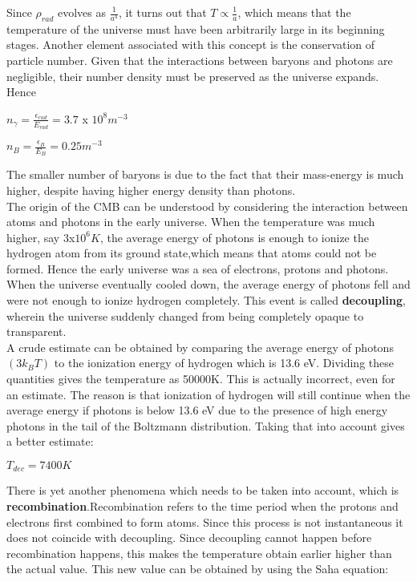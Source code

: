 \documentclass{article}
\begin{document}
Since $\rho_{rad}$ evolves as $\frac{1}{a^4}$, it turns out that $T \propto \frac{1}{a}$, which means that the temperature of the universe must have been arbitrarily large in its beginning stages. Another element associated with this concept is the conservation of particle number. Given that the interactions between baryons and photons are negligible, their number density must be preserved as the universe expands. Hence 

\begin{center}
    $n_{\gamma} = \frac{\epsilon_{rad}}{E_{rad}} = 3.7$ x $10^8 m^{-3}$
\end{center}

\begin{center}
    $n_{B} = \frac{\epsilon_{B}}{E_{B}} = 0.25 m^{-3}$ 
\end{center}

The smaller number of baryons is due to the fact that their mass-energy is much higher, despite having higher energy density than photons.
\\
The origin of the CMB can be understood by considering the interaction between atoms and photons in the early universe. When the temperature was much higher, say $3$x$10^6 K$, the average energy of photons is enough to ionize the hydrogen atom from its ground state,which means that atoms could not be formed. Hence the early universe was a sea of electrons, protons and photons.
When the universe eventually cooled down, the average energy of photons fell and were not enough to ionize hydrogen completely. This event is called \textbf{decoupling}, wherein the universe suddenly changed from being completely opaque to transparent.
\\
A crude estimate can be obtained by comparing the average energy of photons $(3k_{B}T)$ to the ionization energy of hydrogen which is 13.6 eV. Dividing these quantities gives the temperature as 50000K. 
This is actually incorrect, even for an estimate. The reason is that ionization of hydrogen will still continue when the average energy if photons is below 13.6 eV due to the presence of high energy photons in the tail of the Boltzmann distribution. Taking that into account gives a better estimate:

\begin{center}
    $T_{dec} = 7400 K$
\end{center}

There is yet another phenomena which needs to be taken into account, which is \textbf{recombination}.Recombination refers to the time period when the protons and electrons first combined to form atoms. Since this process is not instantaneous it does not coincide with decoupling. Since decoupling cannot happen before recombination happens, this makes the temperature obtain earlier higher than the actual value. This new value can be obtained by using the Saha equation:
\end{document}
